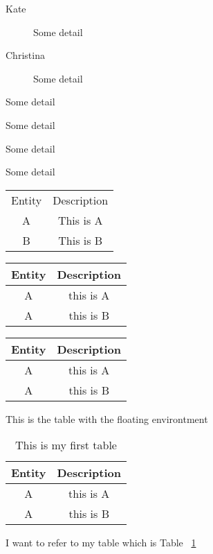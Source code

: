 \documentclass{article}
\begin{document}
\begin{description}
\item [Kate] Some detail 
\item [Christina] Some detail
\end{description}

\begin{description}[noitemsep] %
\item [Kate] Some detail 
\item [Christina] Some detail
\end{description}

\begin{description}[align=right]

\item [Kate] Some detail 
\item [Christina] Some detail
\end{description}
\noindent \begin{tabular}{cc}
Entity & Description \\%
A & This is A \\
B & This is B\\
\end{tabular}

\begin{tabular}{|c|c|}
\hline
Entity & Description \\
\hline %
A & this is A \\
\hline
A & this is B \\
\hline
\end{tabular}


\begin{tabular}{||c||c||}
\hline\hline
Entity & Description \\
\hline\hline %
A & this is A \\
\hline\hline
A & this is B \\
\hline\hline\hline%
\end{tabular}

This is the table with the floating environtment
\vspace{0.5cm}
\begin{table}[p]
\caption{This is my first table}
\begin{centering}
\begin{tabular}{||c||c||}
\hline\hline
Entity & Description \\
\hline\hline %
A & this is A \\
\hline\hline
A & this is B \\
\hline\hline\hline%
\end{tabular}


\end{centering}
\label{first_table}
\end{table}


I want to refer to my table which is Table ~\ref{first_table}
\end{document}
